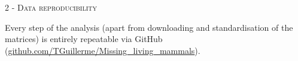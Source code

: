 \documentclass[12pt,letterpaper]{article}
\renewcommand{\section}[1]{%
\bigskip
\begin{center}
\begin{Large}
\normalfont\scshape #1
\medskip
\end{Large}
\end{center}}
\begin{document}
\section{2 - Data reproducibility}
Every step of the analysis (apart from downloading and standardisation of the matrices) is entirely repeatable via GitHub (\url{github.com/TGuillerme/Missing_living_mammals}).



\end{document}
